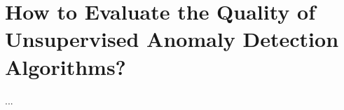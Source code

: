 \chapter{How to Evaluate the Quality of Unsupervised Anomaly Detection Algorithms?}
\label{chap:evaluation}

\begin{chapabstract}
...
\end{chapabstract}